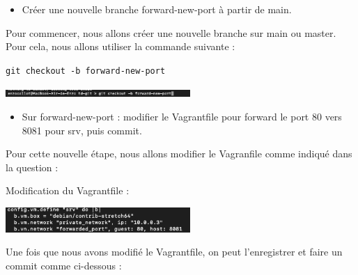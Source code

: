 \documentclass[12pt]{article}
\begin{document}
\vspace{0.3cm}

\begin{itemize}
  \item Créer une nouvelle branche forward-new-port à partir de main.
\end{itemize}

\vspace{0.3cm}

Pour commencer, nous allons créer une nouvelle branche sur main ou master. Pour cela, nous allons utiliser la commande suivante :

\texttt{git checkout -b forward-new-port}

\vspace{0.3cm}

\begin{center}
  \includegraphics[width=7cm]{Image-TD-Git-4/git-checkout.png}
\end{center}

\vspace{0.3cm}

\begin{itemize}
  \item Sur forward-new-port : modifier le Vagrantfile pour forward le port 80 vers 8081 pour srv, puis commit.
\end{itemize}

\vspace{0.3cm}

Pour cette nouvelle étape, nous allons modifier le Vagranfile comme indiqué dans la question :

\vspace{0.3cm}

Modification du Vagrantfile : 

\vspace{0.3cm}

\begin{center}
  \includegraphics[width=7cm]{Image-TD-Git-4/Forward-port.png}
\end{center}

\vspace{0.3cm}

Une fois que nous avons modifié le Vagrantfile, on peut l'enregistrer et faire un commit comme ci-dessous :
\end{document}

